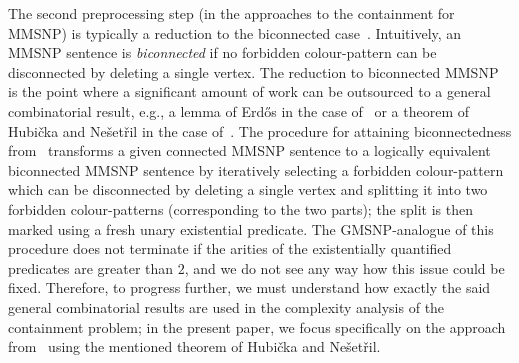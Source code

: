 \documentclass[oneside,reqno,12pt]{amsart}
\theoremstyle{plain}
\theoremstyle{remark}
\begin{document}
The second preprocessing step (in the approaches to the containment for MMSNP) is typically a reduction to the biconnected case~\cite{bouhris_lutz2016,bodirsky2018_article}.
Intuitively, an MMSNP sentence is \emph{biconnected} if no forbidden colour-pattern can be disconnected by deleting a single vertex.
The reduction to biconnected MMSNP is the point where a significant amount of work can be outsourced to a general combinatorial result, e.g., a lemma of Erd\H{o}s in the case of~\cite{bouhris_lutz2016} or a 
theorem of Hubi\v{c}ka and Ne\v{s}et\v{r}il in the case of~\cite{bodirsky2018_article}. 
The procedure for attaining biconnectedness from~\cite[Lemma~4.4]{bodirsky2018_article} transforms a given connected MMSNP sentence to a logically equivalent biconnected MMSNP sentence by iteratively selecting a forbidden colour-pattern which can be disconnected by deleting a single vertex and splitting it into two forbidden colour-patterns (corresponding to the two parts); the split is then marked using a fresh unary existential predicate. 
The GMSNP-analogue of this procedure does not terminate if the arities of the existentially quantified predicates are greater than $2$, and we do not see any way how this issue could be fixed.
Therefore, to progress further, we must understand how exactly the said general combinatorial results are used in the complexity analysis of the containment problem; in the present paper, we focus specifically on the approach from~\cite{bodirsky2018_article} using the mentioned theorem of Hubi\v{c}ka and Ne\v{s}et\v{r}il.
\end{document}
